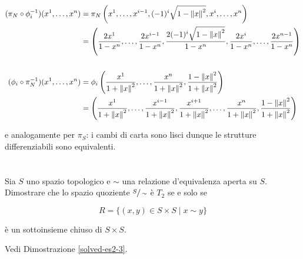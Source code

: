 \begin{align}
	\begin{split}
		(\pi_{N} \circ \phi_{i}^{-1})(x^{1},\dots,x^{n}) &= \pi_{N} \left( x^{1}, \dots, x^{i-1}, (-1)^{i} \sqrt{1 - \norm{x}^{2}}, x^{i}, \dots, x^{n} \right)\\
		&= \left( \dfrac{2 x^{1}}{1-x^{n}}, \dots, \dfrac{2 x^{i-1}}{1-x^{n}}, \dfrac{2 (-1)^{i} \sqrt{1 - \norm{x}^{2}}}{1-x^{n}}, \dfrac{2 x^{i}}{1-x^{n}}, \dots, \dfrac{2 x^{n-1}}{1-x^{n}} \right)\\\\
		(\phi_{i} \circ \pi_{N}^{-1})(x^{1},\dots,x^{n}) &= \phi_{i} \left( \dfrac{x^{1}}{1 + \norm{x}^{2}}, \dots, \dfrac{x^{n}}{1 + \norm{x}^{2}}, \dfrac{1 - \norm{x}^{2}}{1 + \norm{x}^{2}} \right)\\
		&= \left( \dfrac{x^{1}}{1 + \norm{x}^{2}}, \dots, \dfrac{x^{i-1}}{1 + \norm{x}^{2}}, \dfrac{x^{i+1}}{1 + \norm{x}^{2}}, \dots, \dfrac{x^{n}}{1 + \norm{x}^{2}}, \dfrac{1 - \norm{x}^{2}}{1 + \norm{x}^{2}} \right)
	\end{split}
\end{align}

e analogamente per $ \pi_{S} $: i cambi di carta sono lisci dunque le strutture differenziabili sono equivalenti.

%

\newpage

%

\section{}\label{es2-3}

\begin{tcolorbox}
	Sia $ S $ uno spazio topologico e $ \sim $ una relazione d'equivalenza aperta su $ S $. Dimostrare che lo spazio quoziente $ \sfrac{S}{\sim} $ è $ T_{2} $ se e solo se
	
	\begin{equation}
		R = \{ (x,y) \in S \times S \mid x \sim y \}
	\end{equation}
	
	è un sottoinsieme chiuso di $ S \times S $.
\end{tcolorbox}

Vedi Dimostrazione \ref{solved-es2-3}.

%

\newpage

%

\section{}\label{es2-4}

